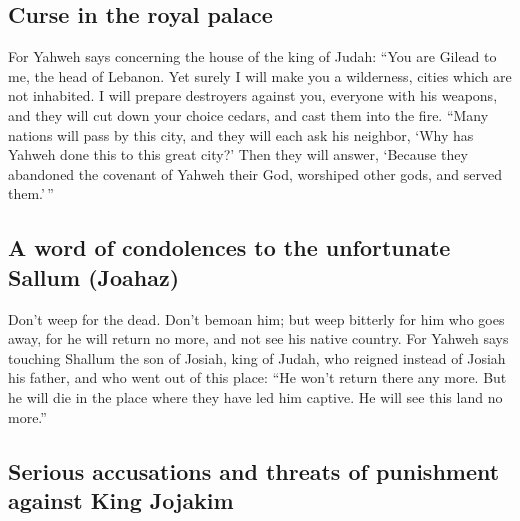 \hypertarget{curse-in-the-royal-palace}{%
\subsection{Curse in the royal palace}\label{curse-in-the-royal-palace}}

 For Yahweh says concerning the house of the king of
Judah: ``You are Gilead to me, the head of Lebanon. Yet surely I will
make you a wilderness, cities which are not inhabited.  I
will prepare destroyers against you, everyone with his weapons, and they
will cut down your choice cedars, and cast them into the fire.
 ``Many nations will pass by this city, and they will each
ask his neighbor, `Why has Yahweh done this to this great city?'
 Then they will answer, `Because they abandoned the
covenant of Yahweh their God, worshiped other gods, and served
them.'\,''

\hypertarget{a-word-of-condolences-to-the-unfortunate-sallum-joahaz}{%
\subsection{A word of condolences to the unfortunate Sallum
(Joahaz)}\label{a-word-of-condolences-to-the-unfortunate-sallum-joahaz}}

 Don't weep for the dead. Don't bemoan him; but weep
bitterly for him who goes away, for he will return no more, and not see
his native country.  For Yahweh says touching Shallum the
son of Josiah, king of Judah, who reigned instead of Josiah his father,
and who went out of this place: ``He won't return there any more.
 But he will die in the place where they have led him
captive. He will see this land no more.''

\hypertarget{serious-accusations-and-threats-of-punishment-against-king-jojakim}{%
\subsection{Serious accusations and threats of punishment against King
Jojakim}\label{serious-accusations-and-threats-of-punishment-against-king-jojakim}}

